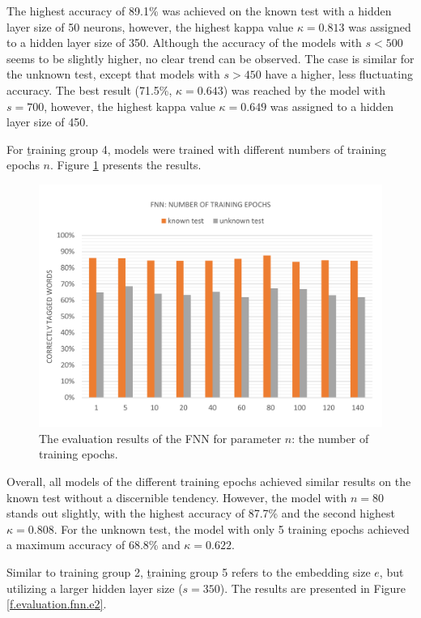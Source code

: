 The highest accuracy of 89.1\% was achieved on the known test with a hidden layer size of 50 neurons, however, the highest kappa value $\kappa=0.813$ was assigned to a hidden layer size of 350. Although the accuracy of the models with $s<500$ seems to be slightly higher, no clear trend can be observed. The case is similar for the unknown test, except that models with $s>450$ have a higher, less fluctuating accuracy. The best result (71.5\%, $\kappa=0.643$) was reached by the model with $s=700$, however, the highest kappa value $\kappa=0.649$ was assigned to a hidden layer size of 450.

For \b{training group 4}, models were trained with different numbers of training epochs $n$. Figure \ref{f.evaluation.fnn.n} presents the results.

\begin{figure}[H]
	\hspace{-5mm}\includegraphics[width=1.07\textwidth]{images/evaluation_fnn_n}
	\caption[FNN Evaluation: Number of Training Epochs]{The evaluation results of the FNN for parameter $n$: the number of training epochs.}
	\label{f.evaluation.fnn.n}
\end{figure}

Overall, all models of the different training epochs achieved similar results on the known test without a discernible tendency. However, the model with $n=80$ stands out slightly, with the highest accuracy of 87.7\% and the second highest $\kappa=0.808$. For the unknown test, the model with only 5 training epochs achieved a maximum accuracy of 68.8\% and $\kappa=0.622$.

Similar to training group 2, \b{training group 5} refers to the embedding size $e$, but utilizing a larger hidden layer size ($s=350$). The results are presented in Figure {\ref{f.evaluation.fnn.e2}}.

